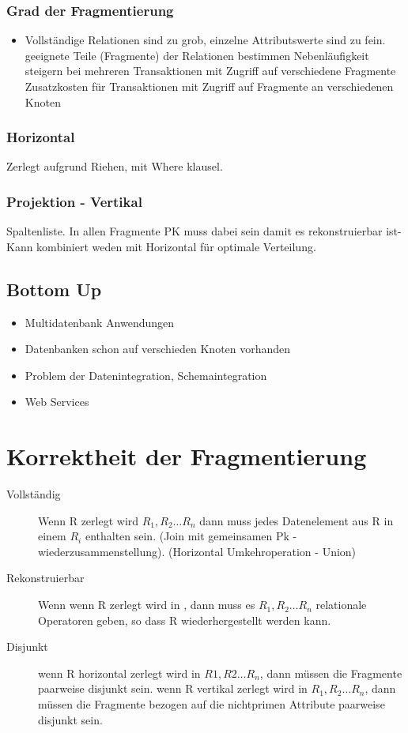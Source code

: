 \documentclass[a4paper,10pt,titlepage=false]{scrreprt}
\begin{document}
\subsubsection{Grad der Fragmentierung}
\begin{itemize}
\item Vollständige Relationen sind zu grob, einzelne
Attributswerte sind zu fein.
\subitem geeignete Teile (Fragmente) der Relationen
bestimmen
\subitem Nebenläufigkeit steigern bei mehreren Transaktionen
mit Zugriff auf verschiedene Fragmente
\subitem Zusatzkosten für Transaktionen mit Zugriff auf
Fragmente an verschiedenen Knoten
\end{itemize}

\subsubsection{Horizontal}
Zerlegt aufgrund Riehen, mit Where klausel.
\subsubsection{Projektion - Vertikal}
Spaltenliste. In allen Fragmente PK muss dabei sein damit es rekonstruierbar ist-
Kann kombiniert weden mit Horizontal für optimale Verteilung.

\subsection{Bottom Up}
\begin{itemize}
 \item Multidatenbank Anwendungen
\item Datenbanken schon auf verschieden Knoten vorhanden
\item Problem der Datenintegration, Schemaintegration
\item Web Services
\end{itemize}

\section{Korrektheit der Fragmentierung}
\begin{description}
 \item [Vollständig] Wenn R zerlegt wird $R_1,R_2 \ldots R_n$ dann muss jedes Datenelement aus R in einem $R_i$ 
enthalten sein. (Join mit gemeinsamen Pk - wiederzusammenstellung). (Horizontal Umkehroperation - Union)%
\item [Rekonstruierbar] Wenn wenn R zerlegt wird in , dann muss es $R_1,R_2 \ldots R_n$
relationale Operatoren geben, so dass R wiederhergestellt
werden kann.
\item[Disjunkt] wenn R horizontal zerlegt wird in $R1,R2 \ldots R_n$, dann
müssen die Fragmente paarweise disjunkt sein.
wenn R vertikal zerlegt wird in $R_1,R_2 \ldots R_n$, dann müssen
die Fragmente bezogen auf die nichtprimen Attribute
paarweise disjunkt sein.
\end{description}
\end{document}
